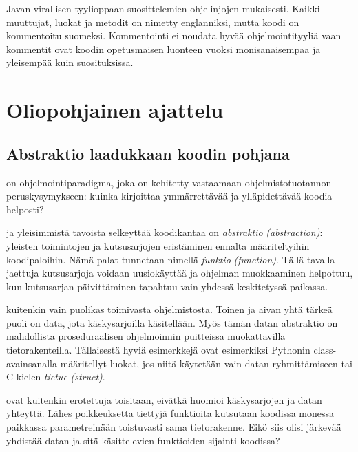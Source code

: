 \documentclass{tufte-book}
\newcommand{\eng}[1]{\textit{(#1)}}
\newcommand{\new}[1]{\textit{\gls{#1}}}
\newcommand{\neweng}[2]{\new{#1} \eng{#2}}
\begin{document}
 Javan virallisen tyylioppaan suosittelemien
ohjelinjojen mukaisesti. Kaikki muuttujat, luokat ja metodit on nimetty englanniksi, mutta koodi
on kommentoitu suomeksi. Kommentointi ei noudata hyvää ohjelmointityyliä vaan kommentit ovat
koodin opetusmaisen luonteen vuoksi monisanaisempaa ja yleisempää kuin suosituksissa.


\chapter{Oliopohjainen ajattelu}
\label{olioista}


\section{Abstraktio laadukkaan koodin pohjana}

 on ohjelmointiparadigma, joka on kehitetty vastaamaan
ohjelmistotuotannon peruskysymykseen: kuinka kirjoittaa ymmärrettävää ja ylläpidettävää koodia
helposti?

 ja yleisimmistä tavoista selkeyttää koodikantaa on
\neweng{abstraktio}{abstraction}: yleisten toimintojen ja kutsusarjojen eristäminen ennalta
määriteltyihin koodipaloihin. Nämä palat tunnetaan nimellä \neweng{funktio}{function}. Tällä
tavalla jaettuja kutsusarjoja voidaan uusiokäyttää ja ohjelman muokkaaminen helpottuu, kun
kutsusarjan päivittäminen tapahtuu vain yhdessä keskitetyssä paikassa.

 kuitenkin vain puolikas toimivasta ohjelmistosta. Toinen ja aivan
yhtä tärkeä puoli on data, jota käskysarjoilla käsitellään. Myös tämän datan abstraktio on
mahdollista proseduraalisen ohjelmoinnin puitteissa muokattavilla tietorakenteilla. Tällaisestä
hyviä esimerkkejä ovat esimerkiksi Pythonin class-avainsanalla määritellyt luokat, jos niitä
käytetään vain datan ryhmittämiseen tai C-kielen \neweng{tietue}{struct}.

 ovat kuitenkin erotettuja toisitaan, eivätkä huomioi
käskysarjojen ja datan yhteyttä. Lähes poikkeuksetta tiettyjä funktioita kutsutaan koodissa
monessa paikkassa parametreinään toistuvasti sama tietorakenne. Eikö siis olisi järkevää yhdistää
datan ja sitä käsittelevien funktioiden sijainti koodissa?
\end{document}
